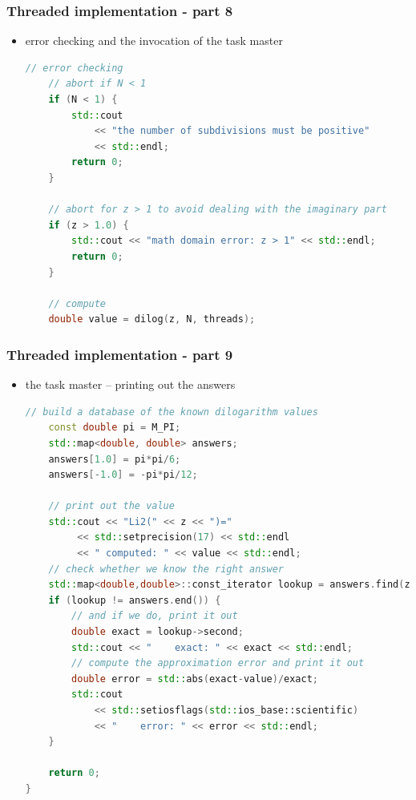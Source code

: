 \begin{frame}[fragile]
%
  \frametitle{Threaded implementation - part 8}
%
  \begin{itemize}
  \item error checking and the invocation of the task master
  \begin{lstlisting}[language=c++,name=threaded]
    // error checking
    // abort if N < 1
    if (N < 1) {
        std::cout 
            << "the number of subdivisions must be positive"
            << std::endl;
        return 0;
    }

    // abort for z > 1 to avoid dealing with the imaginary part
    if (z > 1.0) {
        std::cout << "math domain error: z > 1" << std::endl;
        return 0;
    } 

    // compute
    double value = dilog(z, N, threads);

  \end{lstlisting}
%
  \end{itemize}
%
\end{frame}

\begin{frame}[fragile]
%
  \frametitle{Threaded implementation - part 9}
%
  \begin{itemize}
  \item the task master -- printing out the answers
  \begin{lstlisting}[language=c++,name=threaded]
    // build a database of the known dilogarithm values
    const double pi = M_PI;
    std::map<double, double> answers;
    answers[1.0] = pi*pi/6;
    answers[-1.0] = -pi*pi/12;

    // print out the value
    std::cout << "Li2(" << z << ")="
         << std::setprecision(17) << std::endl
         << " computed: " << value << std::endl;
    // check whether we know the right answer
    std::map<double,double>::const_iterator lookup = answers.find(z);
    if (lookup != answers.end()) {
        // and if we do, print it out
        double exact = lookup->second;
        std::cout << "    exact: " << exact << std::endl;
        // compute the approximation error and print it out
        double error = std::abs(exact-value)/exact;
        std::cout 
            << std::setiosflags(std::ios_base::scientific) 
            << "    error: " << error << std::endl;
    }

    return 0;
}
  \end{lstlisting}
%
  \end{itemize}
%
\end{frame}

